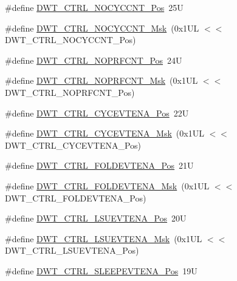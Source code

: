 \begin{DoxyCompactItemize}
\item 
\#define \hyperlink{group___c_m_s_i_s___d_w_t_ga337f6167d960f57f12aa382ffecce522}{D\+W\+T\+\_\+\+C\+T\+R\+L\+\_\+\+N\+O\+C\+Y\+C\+C\+N\+T\+\_\+\+Pos}~25U
\item 
\#define \hyperlink{group___c_m_s_i_s___d_w_t_gaf40c8d7a4fd978034c137e90f714c143}{D\+W\+T\+\_\+\+C\+T\+R\+L\+\_\+\+N\+O\+C\+Y\+C\+C\+N\+T\+\_\+\+Msk}~(0x1\+U\+L $<$$<$ D\+W\+T\+\_\+\+C\+T\+R\+L\+\_\+\+N\+O\+C\+Y\+C\+C\+N\+T\+\_\+\+Pos)
\item 
\#define \hyperlink{group___c_m_s_i_s___d_w_t_gad52a0e5be84363ab166cc17beca0d048}{D\+W\+T\+\_\+\+C\+T\+R\+L\+\_\+\+N\+O\+P\+R\+F\+C\+N\+T\+\_\+\+Pos}~24U
\item 
\#define \hyperlink{group___c_m_s_i_s___d_w_t_gafd8448d7db4bc51f27f202e6e1f27823}{D\+W\+T\+\_\+\+C\+T\+R\+L\+\_\+\+N\+O\+P\+R\+F\+C\+N\+T\+\_\+\+Msk}~(0x1\+U\+L $<$$<$ D\+W\+T\+\_\+\+C\+T\+R\+L\+\_\+\+N\+O\+P\+R\+F\+C\+N\+T\+\_\+\+Pos)
\item 
\#define \hyperlink{group___c_m_s_i_s___d_w_t_ga0cb0640aaeb18a626d7823570d5c3cb6}{D\+W\+T\+\_\+\+C\+T\+R\+L\+\_\+\+C\+Y\+C\+E\+V\+T\+E\+N\+A\+\_\+\+Pos}~22U
\item 
\#define \hyperlink{group___c_m_s_i_s___d_w_t_ga40554bd81460e39abf08810f45fac1a2}{D\+W\+T\+\_\+\+C\+T\+R\+L\+\_\+\+C\+Y\+C\+E\+V\+T\+E\+N\+A\+\_\+\+Msk}~(0x1\+U\+L $<$$<$ D\+W\+T\+\_\+\+C\+T\+R\+L\+\_\+\+C\+Y\+C\+E\+V\+T\+E\+N\+A\+\_\+\+Pos)
\item 
\#define \hyperlink{group___c_m_s_i_s___d_w_t_ga5602b0707f446ce78d88ff2a3a82bfff}{D\+W\+T\+\_\+\+C\+T\+R\+L\+\_\+\+F\+O\+L\+D\+E\+V\+T\+E\+N\+A\+\_\+\+Pos}~21U
\item 
\#define \hyperlink{group___c_m_s_i_s___d_w_t_ga717e679d775562ae09185a3776b1582f}{D\+W\+T\+\_\+\+C\+T\+R\+L\+\_\+\+F\+O\+L\+D\+E\+V\+T\+E\+N\+A\+\_\+\+Msk}~(0x1\+U\+L $<$$<$ D\+W\+T\+\_\+\+C\+T\+R\+L\+\_\+\+F\+O\+L\+D\+E\+V\+T\+E\+N\+A\+\_\+\+Pos)
\item 
\#define \hyperlink{group___c_m_s_i_s___d_w_t_gaea5d1ee72188dc1d57b54c60a9f5233e}{D\+W\+T\+\_\+\+C\+T\+R\+L\+\_\+\+L\+S\+U\+E\+V\+T\+E\+N\+A\+\_\+\+Pos}~20U
\item 
\#define \hyperlink{group___c_m_s_i_s___d_w_t_gac47427f455fbc29d4b6f8a479169f2b2}{D\+W\+T\+\_\+\+C\+T\+R\+L\+\_\+\+L\+S\+U\+E\+V\+T\+E\+N\+A\+\_\+\+Msk}~(0x1\+U\+L $<$$<$ D\+W\+T\+\_\+\+C\+T\+R\+L\+\_\+\+L\+S\+U\+E\+V\+T\+E\+N\+A\+\_\+\+Pos)
\item 
\#define \hyperlink{group___c_m_s_i_s___d_w_t_ga9c6d62d121164013a8e3ee372f17f3e5}{D\+W\+T\+\_\+\+C\+T\+R\+L\+\_\+\+S\+L\+E\+E\+P\+E\+V\+T\+E\+N\+A\+\_\+\+Pos}~19U
$$
\end{DoxyCompactItemize}

